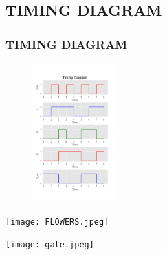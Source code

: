\documentclass{beamer}
\numberwithin{equation}{section}
\begin{document}
\subsection{TIMING DIAGRAM}
\begin{frame}
\frametitle{TIMING DIAGRAM}

\begin{center}
\includegraphics[width=200,height=200]{graph.pdf}
\end{center}


\end{frame}


\begin{frame}
\begin{center}
\end{center}
\begin{center}
\texttt{[image: FLOWERS.jpeg]}
\end{center}
\begin{corner}
\texttt{[image: gate.jpeg]}
\end{corner}
\end{frame}
\end{document}
